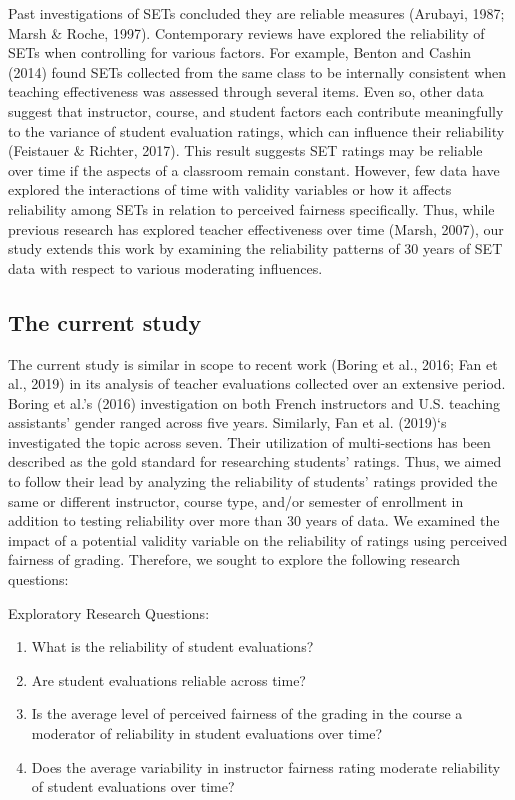 \documentclass[
  man]{apa7}
\providecommand{\tightlist}{%
  \setlength{\itemsep}{0pt}\setlength{\parskip}{0pt}}
\begin{document}
Past investigations of SETs concluded they are reliable measures
(Arubayi, 1987; Marsh \& Roche, 1997). Contemporary reviews have explored the
reliability of SETs when controlling for various factors. For example,
Benton and Cashin (2014) found SETs collected from the same class to be internally
consistent when teaching effectiveness was assessed through several
items. Even so, other data suggest that instructor, course, and student
factors each contribute meaningfully to the variance of student
evaluation ratings, which can influence their reliability
(Feistauer \& Richter, 2017). This result suggests SET ratings may be reliable over
time if the aspects of a classroom remain constant. However, few data
have explored the interactions of time with validity variables or how it
affects reliability among SETs in relation to perceived fairness
specifically. Thus, while previous research has explored teacher
effectiveness over time (Marsh, 2007), our study extends this work by
examining the reliability patterns of 30 years of SET data with respect
to various moderating influences.

\hypertarget{the-current-study}{%
\subsection{The current study}\label{the-current-study}}

The current study is similar in scope to recent work (Boring et al., 2016; Fan et al., 2019) in its analysis of teacher evaluations collected over an
extensive period. Boring et al.'s (2016) investigation on both
French instructors and U.S. teaching assistants' gender ranged across
five years. Similarly, Fan et al. (2019)`s investigated the topic across seven.
Their utilization of multi-sections has been described as the gold
standard for researching students' ratings. Thus, we aimed to follow
their lead by analyzing the reliability of students' ratings provided
the same or different instructor, course type, and/or semester of
enrollment in addition to testing reliability over more than 30 years of
data. We examined the impact of a potential validity variable on the
reliability of ratings using perceived fairness of grading. Therefore,
we sought to explore the following research questions:

Exploratory Research Questions:

\begin{enumerate}
\def\labelenumi{\arabic{enumi})}
\tightlist
\item
  What is the reliability of student evaluations?
\item
  Are student evaluations reliable across time?
\item
  Is the average level of perceived fairness of the grading in the
  course a moderator of reliability in student evaluations over time?
\item
  Does the average variability in instructor fairness rating moderate
  reliability of student evaluations over time?
\end{enumerate}
\end{document}
